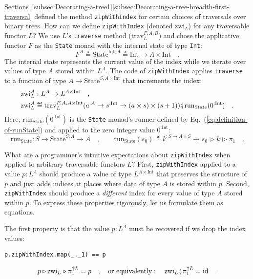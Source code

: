 Sections~\ref{subsec:Decorating-a-tree1}\textendash \ref{subsec:Decorating-a-tree-breadth-first-traversal}
defined the method \lstinline!zipWithIndex! for certain choices of
traversals over binary trees. How can we define \lstinline!zipWithIndex!
(denoted $\text{zwi}_{L}$) for any traversable functor $L$? We use
$L$\textsf{'}s \lstinline!traverse! method ($\text{trav}_{L}^{F,A,B}$) and
chose the applicative functor $F$ as the \lstinline!State! monad
with the internal state of type \lstinline!Int!:
\[
F^{A}\triangleq\text{State}^{\text{Int},A}\triangleq\text{Int}\rightarrow A\times\text{Int}\quad.
\]
The internal state represents the current value of the index while
we iterate over values of type $A$ stored within $L^{A}$. The code
of \lstinline!zipWithIndex! applies \lstinline!traverse! to a function
of type $A\rightarrow\text{State}^{S,A\times\text{Int}}$ that increments
the index:
\begin{align}
 & \text{zwi}_{L}^{A}:L^{A}\rightarrow L^{A\times\text{Int}}\quad,\nonumber \\
 & \text{zwi}_{L}^{A}\triangleq\text{trav}_{L}^{F,A,A\times\text{Int}}(a^{:A}\rightarrow s^{:\text{Int}}\rightarrow(a\times s)\times(s+1))\bef\text{run}_{\text{State}}(0^{:\text{Int}})\quad.\label{eq:definition-of-zwi}
\end{align}
Here, $\text{run}_{\text{State}}(0^{:\text{Int}})$ is the \lstinline!State!
monad\textsf{'}s runner defined by Eq.~(\ref{eq:definition-of-runState})
and applied to the zero integer value $0^{:\text{Int}}$:
\[
\text{run}_{\text{State}}:S\rightarrow\text{State}^{S,A}\rightarrow A\quad,\quad\quad\text{run}_{\text{State}}(s_{0})\triangleq k^{:S\rightarrow A\times S}\rightarrow s_{0}\triangleright k\triangleright\pi_{1}\quad.
\]

What are a programmer\textsf{'}s intuitive expectations about \lstinline!zipWithIndex!
when applied to arbitrary traversable functors $L$? First, \lstinline!zipWithIndex!
applied to a value $p:L^{A}$ should produce a value of type $L^{A\times\text{Int}}$
that preserves the structure of $p$ and just adds indices at places
where data of type $A$ is stored within $p$. Second, \lstinline!zipWithIndex!
should produce a \emph{different} index for every value of type $A$
stored within $p$. To express these properties rigorously, let us
formulate them as equations.

The first property is that the value $p:L^{A}$ must be recovered
if we drop the index values:
\begin{lstlisting}
p.zipWithIndex.map(_._1) == p
\end{lstlisting}
\[
p\triangleright\text{zwi}_{L}\triangleright\pi_{1}^{\uparrow L}=p\quad,\quad\text{or equivalently}:\quad\text{zwi}_{L}\bef\pi_{1}^{\uparrow L}=\text{id}\quad.
\]

